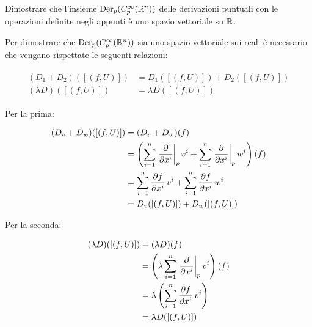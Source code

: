 \tocless\section{}\label{es1-8}

\begin{tcolorbox}
	Dimostrare che l'insieme $ \operatorname{Der}_{p}(C_{p}^{\infty}(\mathbb{R}^{n})) $ delle derivazioni puntuali con le operazioni definite negli appunti è uno spazio vettoriale su $ \mathbb{R} $.
\end{tcolorbox}

Per dimostrare che $ \operatorname{Der}_{p}(C_{p}^{\infty}(\mathbb{R}^{n})) $ sia uno spazio vettoriale sui reali è necessario che vengano rispettate le seguenti relazioni:

\begin{align}
	\begin{split}
		(D_{1} + D_{2}) ([(f,U)]) &= D_{1}([(f,U)]) + D_{2}([(f,U)])\\
		(\lambda D) ([(f,U)]) &= \lambda D ([(f,U)])
	\end{split}
\end{align}

Per la prima:

\begin{align}
	\begin{split}
		(D_{v} + D_{w}) ([(f,U)]) &= (D_{v} + D_{w}) (f)\\
		&= \left( \sum_{i=1}^{n} \eval{ \pdv{x^{i}} }_{p} v^{i} + \sum_{i=1}^{n} \eval{ \pdv{x^{i}} }_{p} w^{i} \right) (f)\\
		&= \sum_{i=1}^{n} \pdv{f}{x^{i}} (p) \, v^{i} + \sum_{i=1}^{n} \pdv{f}{x^{i}} (p) \, w^{i}\\
		&= D_{v}([(f,U)]) + D_{w}([(f,U)])
	\end{split}
\end{align}

Per la seconda:

\begin{align}
	\begin{split}
		(\lambda D) ([(f,U)])  &= (\lambda D) (f)\\
		&= \left( \lambda \sum_{i=1}^{n} \eval{ \pdv{x^{i}} }_{p} v^{i} \right) (f)\\
		&= \lambda \left( \sum_{i=1}^{n} \pdv{f}{x^{i}} (p) \, v^{i} \right)\\
		&= \lambda D ([(f,U)])
	\end{split}
\end{align}

\tocless\section{}\label{es1-9}

